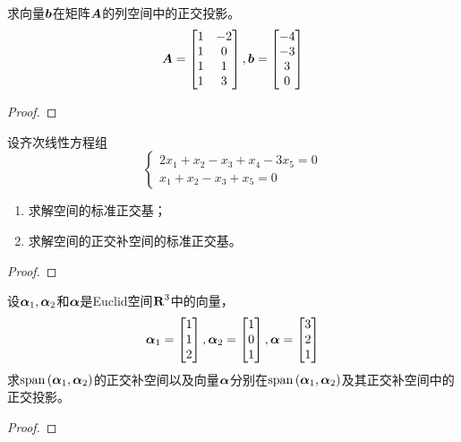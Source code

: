 \begin{problem}
求向量\(\boldsymbol{b}\)在矩阵\(\boldsymbol{A}\)的列空间中的正交投影。
\begin{equation*}
    \boldsymbol{A}=
    \begin{bmatrix}
        1 & -2 \\
        1 & 0  \\
        1 & 1  \\
        1 & 3
    \end{bmatrix},
    \boldsymbol{b}=\begin{bmatrix}-4\\-3\\3\\0\end{bmatrix}
\end{equation*}
\end{problem}
\begin{proof}

\end{proof}

\begin{problem}
设齐次线性方程组
\begin{equation*}
    \begin{cases}
        2x_1+x_2-x_3+x_4-3x_5=0 \\
        x_1+x_2-x_3+x_5=0
    \end{cases}
\end{equation*}
\begin{enumerate}
    \item 求解空间的标准正交基；
    \item 求解空间的正交补空间的标准正交基。
\end{enumerate}
\end{problem}
\begin{proof}

\end{proof}

\begin{problem}
设\(\boldsymbol{\alpha}_1,\boldsymbol{\alpha}_2\)和\(\boldsymbol{\alpha}\)是Euclid空间\(\boldsymbol{\mathrm{R}}^3\)中的向量，
\begin{equation*}
    \boldsymbol{\alpha}_1=\begin{bmatrix}1\\1\\2\end{bmatrix},
    \boldsymbol{\alpha}_2=\begin{bmatrix}1\\0\\1\end{bmatrix},
    \boldsymbol{\alpha}=\begin{bmatrix}3\\2\\1\end{bmatrix}
\end{equation*}
求\(\mathrm{span}\left( \boldsymbol{\alpha}_1,\boldsymbol{\alpha}_2 \right)\)的正交补空间以及向量\(\boldsymbol{\alpha}\)分别在\(\mathrm{span}\left( \boldsymbol{\alpha}_1,\boldsymbol{\alpha}_2 \right)\)及其正交补空间中的正交投影。
\end{problem}
\begin{proof}

\end{proof}

